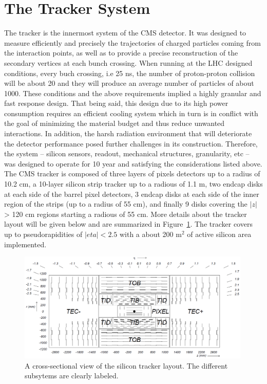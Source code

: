 \section{The Tracker System}
The tracker is the innermost system of the CMS detector.
It was designed to measure efficiently and precisely the trajectories
of charged particles coming from the interaction points, as well as to
provide a precise reconstruction of the secondary vertices at each
bunch crossing. When running at the LHC designed conditions, every
buch crossing, i.e 25 ns, the number of proton-proton collision will
be about 20 and they will produce an average number of particles of about
1000. These conditions and the above requirements implied a highly granular and fast
response design. That being said, this design due to its high power
consumption requires an efficient cooling system which in turn is in
conflict with the goal of minimizing the material budget and thus
reduce unwanted interactions. In addition, the harsh radiation
environment that will deteriorate the detector performance posed
further challenges in its construction. Therefore, the system --
silicon sensors, readout, mechanical structures, granularity, etc --
was designed to operate for 10 year and satisfying the considerations
listed above. The CMS tracker is composed of three layers of pixels
detectors up to a radius of 10.2 cm, a 10-layer silicon strip tracker
up to a radious of 1.1 m, two endcap disks at each side of the barrel pixel detectors, 3
endcap disks at each side of the inner region of the strips (up to a
radius of 55 cm), and finally 9 disks covering the $|z|$ > 120 cm
regions starting a radious of 55 cm. More details about the tracker
layout will be given below and are summarized in
Figure~\ref{fig:trackerlayout}. The tracker covers up to
pseudorapidities of $|eta| < 2.5$ with a about 200 m$^2$ of active
silicon area implemented. 
\begin{figure}
 \centering
\includegraphics[width=0.99\textwidth]{CMS_DetectorFigures/TrackerLayout.png}
 \caption{A cross-sectional view of the silicon tracker layout. The
   different subsytems are clearly labeled.\label{fig:trackerlayout}}
\end{figure}

